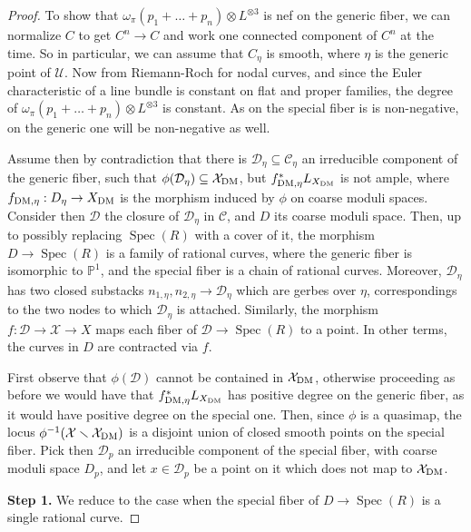 \documentclass{amsart}
\newcommand{\bP}{\mathbb{P}}
\newcommand{\cC}{\mathcal{C}}
\newcommand{\cD}{\mathcal{D}}
\newcommand{\cU}{\mathcal{U}}
\newcommand{\cX}{\mathcal{X}}
\newcommand{\spec}{\operatorname{Spec}}
\newcommand{\dm}{{\rm DM}}
\theoremstyle{definition}
\theoremstyle{definition}
\begin{document}
{\begin{proof}
     To show that $\omega_\pi(p_1+\ldots+p_n)\otimes L^{\otimes 3}$ is nef on the generic fiber, we can normalize $C$ to get $C^n\to C$ and work one connected component of $C^n$ at the time. So in particular, we can assume that $C_\eta$ is smooth, where $\eta$ is the generic point of $\cU$. Now from Riemann-Roch for nodal curves, and since the Euler characteristic of a line bundle is constant on flat and proper families, the degree of $\omega_\pi(p_1+\ldots+p_n)\otimes L^{\otimes 3}$ is constant. As on the special fiber is is non-negative, on the generic one will be non-negative as well.

     Assume then by contradiction that there is $\cD_\eta\subseteq \cC_\eta$ an irreducible component of the generic fiber, such that $\phi(\cD_\eta)\subseteq \cX_\dm$, but $f_{\dm,\eta}^*L_{X_\dm}$ is not ample, where $f_{\dm,\eta}:D_\eta\to X_\dm$ is the morphism induced by $\phi$ on coarse moduli spaces.
     Consider then $\cD$ the closure of $\cD_\eta$ in $\cC$, and $D$ its coarse moduli space. Then, up to possibly replacing $\spec(R)$ with a cover of it, the morphism $D\to \spec(R)$ is a family of rational curves, where the generic fiber is isomorphic to $\bP^1$, and the special fiber is a chain of rational curves.
     Moreover, $\cD_\eta$ has two closed substacks $n_{1,\eta}, n_{2,\eta}\to \cD_\eta$ which are gerbes over $\eta$, correspondings to the two nodes to which $\cD_\eta$ is attached.
     Similarly, the morphism $f:\cD\to \cX\to X$ maps each fiber of $\cD\to \spec(R)$ to a point. In other terms, the curves in $D$ are contracted via $f$.
     
     First observe that $\phi(\cD)$ cannot be contained in $\cX_\dm$, otherwise proceeding as before we would have that $f_{\dm,\eta}^*L_{X_\dm}$ has positive degree on the generic fiber, as it would have positive degree on the special one. Then, since $\phi$ is a quasimap, the locus $\phi^{-1}(\cX\smallsetminus \cX_\dm)$ is a disjoint union of closed smooth points on the special fiber. Pick then $\cD_p$ an
     irreducible component of the special fiber, with coarse moduli space $D_p$, and let $x\in \cD_p$ be a point on it which does not map to $\cX_\dm$.
     
     \textbf{Step 1.} We reduce to the case when the special fiber of $D\to \spec(R)$ is a single rational curve. 
     

\end{proof}}
\end{document}
